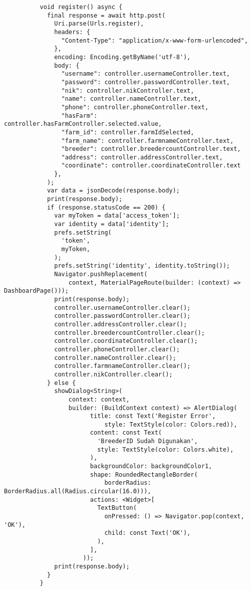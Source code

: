 \begin{lstlisting}
          void register() async {
            final response = await http.post(
              Uri.parse(Urls.register),
              headers: {
                "Content-Type": "application/x-www-form-urlencoded",
              },
              encoding: Encoding.getByName('utf-8'),
              body: {
                "username": controller.usernameController.text,
                "password": controller.passwordController.text,
                "nik": controller.nikController.text,
                "name": controller.nameController.text,
                "phone": controller.phoneController.text,
                "hasFarm": controller.hasFarmController.selected.value,
                "farm_id": controller.farmIdSelected,
                "farm_name": controller.farmnameController.text,
                "breeder": controller.breedercountController.text,
                "address": controller.addressController.text,
                "coordinate": controller.coordinateController.text
              },
            );
            var data = jsonDecode(response.body);
            print(response.body);
            if (response.statusCode == 200) {
              var myToken = data['access_token'];
              var identity = data['identity'];
              prefs.setString(
                'token',
                myToken,
              );
              prefs.setString('identity', identity.toString());
              Navigator.pushReplacement(
                  context, MaterialPageRoute(builder: (context) => DashboardPage()));
              print(response.body);
              controller.usernameController.clear();
              controller.passwordController.clear();
              controller.addressController.clear();
              controller.breedercountController.clear();
              controller.coordinateController.clear();
              controller.phoneController.clear();
              controller.nameController.clear();
              controller.farmnameController.clear();
              controller.nikController.clear();
            } else {
              showDialog<String>(
                  context: context,
                  builder: (BuildContext context) => AlertDialog(
                        title: const Text('Register Error',
                            style: TextStyle(color: Colors.red)),
                        content: const Text(
                          'BreederID Sudah Digunakan',
                          style: TextStyle(color: Colors.white),
                        ),
                        backgroundColor: backgroundColor1,
                        shape: RoundedRectangleBorder(
                            borderRadius: BorderRadius.all(Radius.circular(16.0))),
                        actions: <Widget>[
                          TextButton(
                            onPressed: () => Navigator.pop(context, 'OK'),
                            child: const Text('OK'),
                          ),
                        ],
                      ));
              print(response.body);
            }
          }
        

\end{lstlisting}
